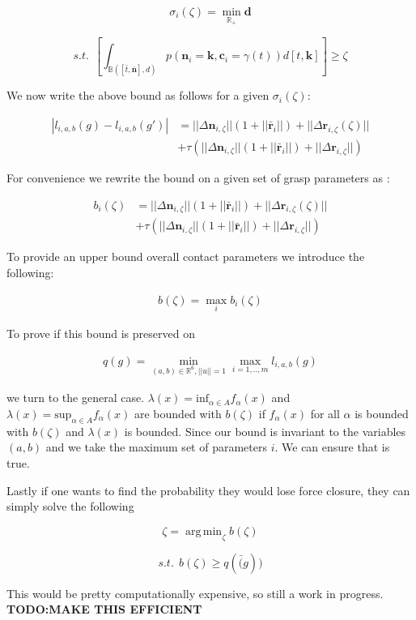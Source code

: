 \documentclass[letterpaper, 10 pt, conference]{ieeeconf}  %
\DeclareMathOperator*{\argmin}{arg\,min}
\begin{document}
\[
  \sigma_i(\zeta)
  =
  \min_{\mathbb{R}_+} \textbf{d}
\]

\[
  s.t. \ \ \left[ \int_{\mathbb{B}([\bar{t},\bar{\textbf{n}}], d)} p(\textbf{n}_i = \textbf{k},\textbf{c}_i=\gamma(t)) d[t,\textbf{k}] \right] \geq \zeta
\]



We now write the above bound as follows for a given $\sigma_i(\zeta)$: 

 \begin{align*}
|l_{i,a,b}(g) - l_{i,a,b}(g')| & =||\Delta \textbf{n}_{i,\zeta}||(1+||\bar{\textbf{r}}_i||) + ||\Delta{\textbf{r}_{i,\zeta}}(\zeta)|| \\
                                      &+ \tau(||\Delta \textbf{n}_{i,\zeta}||(1+||\bar{\textbf{r}}_i||)+||\Delta \textbf{r}_{i,\zeta}||)
\end{align*}

For convenience we rewrite the bound on a given set of grasp parameters as : 

 \begin{align*}
b_i(\zeta) &= ||\Delta \textbf{n}_{i,\zeta}||(1+||\bar{\textbf{r}}_i||) + ||\Delta{\textbf{r}_{i,\zeta}}(\zeta)|| \\
                                      &+ \tau(||\Delta \textbf{n}_{i,\zeta}||(1+||\bar{\textbf{r}}_i||)+||\Delta \textbf{r}_{i,\zeta}||)
\end{align*}

To provide an upper bound overall contact parameters we introduce the following: 

\begin{align}
b(\zeta)  = \max_{i} b_i(\zeta)
\end{align}

To prove if  this bound is preserved on

 \begin{align}
 q(g) = \min_{(a,b) \in \mathbb{R}^6, ||u||=1} \max_{i=1,..,m} l_{i,a,b}(g)
 \end{align}
 
we turn to the general case.
$\lambda(x) = \mbox{inf}_{\alpha \in A} f_\alpha(x)$ and $\lambda(x) = \mbox{sup}_{\alpha \in A} f_\alpha(x)$ are bounded with $b(\zeta)$ if $f_\alpha(x)$ for all $\alpha$ is bounded with $b(\zeta)$ and $\lambda(x)$ is bounded.
Since our bound is invariant to the variables $(a,b)$ and we take the maximum set of parameters $i$.
We can ensure that is true.

Lastly if one wants to find the probability they would lose force closure, they can simply solve the following 

\[
  \zeta
  =
  \argmin_{\zeta} b(\zeta)
\]

\[
  s.t. \ \  b(\zeta) \geq q(\bar(g))
\]

This would be pretty computationally expensive, so still a work in progress. \textbf{TODO:MAKE THIS EFFICIENT}



\end{document}
